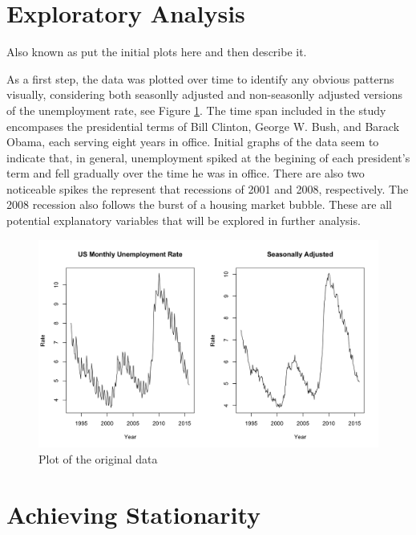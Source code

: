 \documentclass[twoside,twocolumn]{article}
\begin{document}
\section{Exploratory Analysis}

Also known as put the initial plots here and then describe it.

	As a first step, the data was plotted over time to identify any obvious patterns visually, considering both seasonlly adjusted and non-seasonlly adjusted versions of the unemployment rate, see Figure \ref{fig:unemployment}.  The time span included in the study encompases the presidential terms of Bill Clinton, George W. Bush, and Barack Obama, each serving eight years in office.  Initial graphs of the data seem to indicate that, in general, unemployment spiked at the begining of each president's term and fell gradually over the time he was in office. There are also two noticeable spikes the represent that recessions of 2001 and 2008, respectively.  The 2008 recession also follows the burst of a housing market bubble.  These are all potential explanatory variables that will be explored in further analysis.
	
		\begin{figure}[H]
			\centering
			\caption{Plot of the original data}
			\label{fig:unemployment}
			\includegraphics[width=.7\linewidth]{images/Unemployment}
		\end{figure}



\section{Achieving Stationarity}

\end{document}
